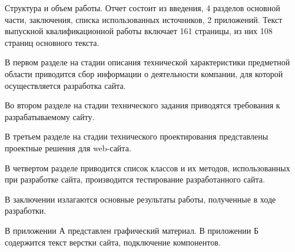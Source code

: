 Структура и объем работы. Отчет состоит из введения, 4 разделов основной части, заключения, списка использованных источников, 2 приложений. Текст выпускной квалификационной работы включает 161 страницы, из них 108 страниц основного текста.

В первом разделе на стадии описания технической характеристики предметной области приводится сбор информации о деятельности компании, для которой осуществляется разработка сайта.

Во втором разделе на стадии технического задания приводятся требования к разрабатываемому сайту.

В третьем разделе на стадии технического проектирования представлены проектные решения для web-сайта.

В четвертом разделе приводится список классов и их методов, использованных при разработке сайта, производится тестирование разработанного сайта.

В заключении излагаются основные результаты работы, полученные в ходе разработки.

В приложении А представлен графический материал.
В приложении Б содержится текст верстки сайта, подключение компонентов. 
